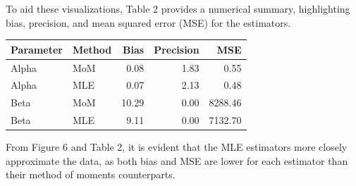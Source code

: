 \documentclass{article}\usepackage[]{graphicx}\usepackage[]{xcolor}
\newenvironment{Figure}
  {\par\medskip\noindent\minipage{\linewidth}}
  {\endminipage\par\medskip}
\begin{document}
\begin{multicols}{2}
To aid these visualizations, Table 2 provides a numerical summary, highlighting bias, precision, and mean squared error (MSE) for the estimators.

\begin{Figure}
\centering
\begin{tabular}{llrrr}
  \hline
 Parameter & Method & Bias & Precision & MSE \\ 
  \hline
  Alpha & MoM & 0.08 & 1.83 & 0.55 \\ 
  Alpha & MLE & 0.07 & 2.13 & 0.48 \\ 
  Beta & MoM & 10.29 & 0.00 & 8288.46 \\ 
  Beta & MLE & 9.11 & 0.00 & 7132.70 \\ 
   \hline
\end{tabular}
\end{Figure}

From Figure 6 and Table 2, it is evident that the MLE estimators more closely approximate the data, as both bias and MSE are lower for each estimator than their method of moments counterparts.

\vspace{2em}

\begin{tiny}

\end{tiny}

\end{multicols}
\end{document}
